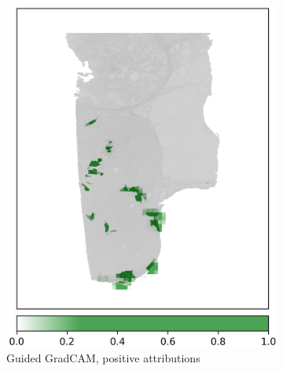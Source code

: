 \begin{figure}[h!t]
\begin{subfigure}[b]{0.49\textwidth}
         \includegraphics[width=\textwidth]{latex/captum/case111/guided_gradcam_pos_case111-stain1-censored_3499days.png}
         \caption{Guided GradCAM, positive attributions}
     \end{subfigure}
    \hfill
     \begin{subfigure}[b]{0.49\textwidth}
         \centering

\end{subfigure}
\end{figure}
